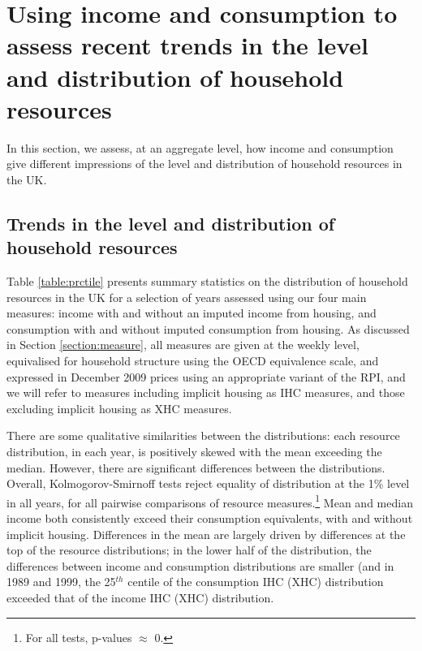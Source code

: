 \section{Using income and consumption to assess recent trends in the level and distribution of household resources}\label{sec:trends}

In this section, we assess, at an aggregate level, how income and consumption give different impressions of the level and distribution of household resources in the UK.

\subsection{Trends in the level and distribution of household resources}

Table \ref{table:prctile} presents summary statistics on the distribution of household resources in the UK for a selection of years assessed using our four main measures: income with and without an imputed income from housing, and consumption with and without imputed consumption from housing. As discussed in Section \ref{section:measure}, all measures are given at the weekly level, equivalised for household structure using the OECD equivalence scale, and expressed in December 2009 prices using an appropriate variant of the RPI, and we will refer to measures including implicit housing as IHC measures, and those excluding implicit housing as XHC measures.  

There are some qualitative similarities between the distributions: each resource distribution, in each year, is positively skewed with the mean exceeding the median. However, there are significant differences between the distributions. Overall, Kolmogorov-Smirnoff tests reject equality of distribution at the 1\% level in all years, for all pairwise comparisons of resource measures.\footnote{For all tests, p-values $\approx$ 0.} Mean and median income both consistently exceed their consumption equivalents, with and without implicit housing. Differences in the mean are largely driven by differences at the top of the resource distributions; in the lower half of the distribution, the differences between income and consumption distributions are smaller (and in 1989 and 1999, the 25$^{th}$ centile of the consumption IHC (XHC) distribution exceeded that of the income IHC (XHC) distribution.

